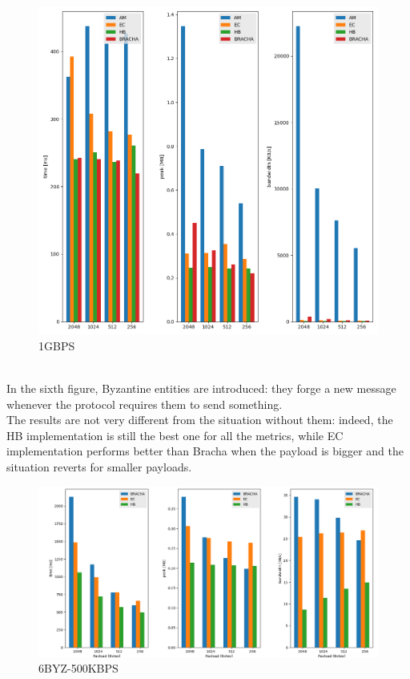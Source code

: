 \documentclass[12pt]{article}
\begin{document}
\begin{figure}
\centering
\includegraphics[scale=0.4]{BAR-BW-1GB-20-proc.png}
\caption{1GBPS}
\label{fig:mesh5}
\end{figure}
\\
In the sixth figure, Byzantine entities are introduced: they forge a new message whenever the protocol requires them to send something.\\
The results are not very different from the situation without them: indeed, the HB implementation is still the best one for all the metrics, while EC implementation performs better than Bracha when the payload is bigger and the situation reverts for smaller payloads. \\
\begin{figure}
\centering
\includegraphics[scale=0.4]{BAR-4BYZ-BW-500KB-20-proc.png}
\caption{6BYZ-500KBPS}
\label{fig:mesh6}
\end{figure}
\end{document}
